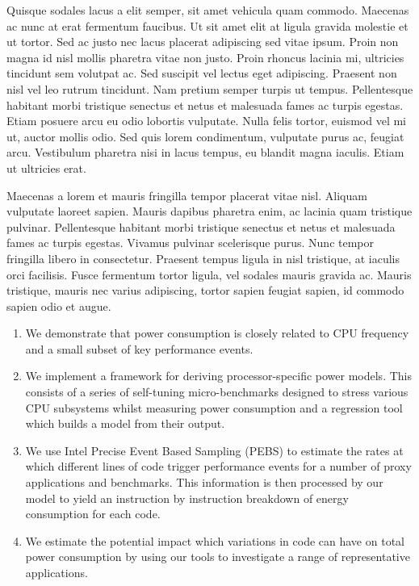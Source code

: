 \documentclass[10pt, a4paper, conference]{IEEEtran}
\begin{document}
Quisque sodales lacus a elit semper, sit amet vehicula quam commodo. Maecenas ac nunc at erat fermentum faucibus. Ut sit amet elit at ligula gravida molestie et ut tortor. Sed ac justo nec lacus placerat adipiscing sed vitae ipsum. Proin non magna id nisl mollis pharetra vitae non justo. Proin rhoncus lacinia mi, ultricies tincidunt sem volutpat ac. Sed suscipit vel lectus eget adipiscing. Praesent non nisl vel leo rutrum tincidunt. Nam pretium semper turpis ut tempus. Pellentesque habitant morbi tristique senectus et netus et malesuada fames ac turpis egestas. Etiam posuere arcu eu odio lobortis vulputate. Nulla felis tortor, euismod vel mi ut, auctor mollis odio. Sed quis lorem condimentum, vulputate purus ac, feugiat arcu. Vestibulum pharetra nisi in lacus tempus, eu blandit magna iaculis. Etiam ut ultricies erat.

Maecenas a lorem et mauris fringilla tempor placerat vitae nisl. Aliquam vulputate laoreet sapien. Mauris dapibus pharetra enim, ac lacinia quam tristique pulvinar. Pellentesque habitant morbi tristique senectus et netus et malesuada fames ac turpis egestas. Vivamus pulvinar scelerisque purus. Nunc tempor fringilla libero in consectetur. Praesent tempus ligula in nisl tristique, at iaculis orci facilisis. Fusce fermentum tortor ligula, vel sodales mauris gravida ac. Mauris tristique, mauris nec varius adipiscing, tortor sapien feugiat sapien, id commodo sapien odio et augue.


\begin{enumerate}
\item We demonstrate that power consumption is closely related to CPU frequency and a small subset of key performance events.
\item We implement a framework for deriving processor-specific power models. This consists of a series of self-tuning micro-benchmarks designed to stress various CPU subsystems whilst measuring power consumption and a regression tool which builds a model from their output.
\item We use Intel Precise Event Based Sampling (PEBS) to estimate the rates at which different lines of code trigger performance events for a number of proxy applications and benchmarks. This information is then processed by our model to yield an instruction by instruction breakdown of energy consumption for each code.
\item We estimate the potential impact which variations in code can have on total power consumption by using our tools to investigate a range of representative applications.
\end{enumerate}
\end{document}
